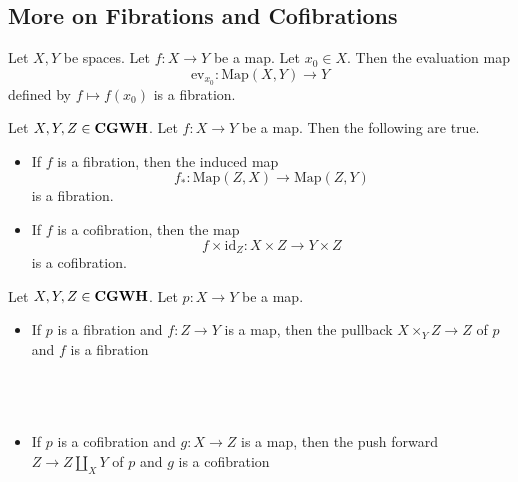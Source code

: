 \documentclass[a4paper]{article}
\begin{document}
\subsection{More on Fibrations and Cofibrations}
\begin{prp}{}{} Let $X,Y$ be spaces. Let $f:X\to Y$ be a map. Let $x_0\in X$. Then the evaluation map $$\text{ev}_{x_0}:\text{Map}(X,Y)\to Y$$ defined by $f\mapsto f(x_0)$ is a fibration. 
\end{prp}

\begin{prp}{}{} Let $X,Y,Z\in\bold{CGWH}$. Let $f:X\to Y$ be a map. Then the following are true. 
\begin{itemize}
\item If $f$ is a fibration, then the induced map $$f_\ast:\text{Map}(Z,X)\to\text{Map}(Z,Y)$$ is a fibration. 
\item If $f$ is a cofibration, then the map $$f\times\text{id}_Z:X\times Z\to Y\times Z$$ is a cofibration. 
\end{itemize}
\end{prp}

\begin{prp}{}{} Let $X,Y,Z\in\bold{CGWH}$. Let $p:X\to Y$ be a map. 
\begin{itemize}
\item If $p$ is a fibration and $f:Z\to Y$ is a map, then the pullback $X\times_YZ\to Z$ of $p$ and $f$ is a fibration \\~\\
\\~\\
\item If $p$ is a cofibration and $g:X\to Z$ is a map, then the push forward $Z\to Z\coprod_XY$ of $p$ and $g$ is a cofibration \\~\\
\\~\\
\end{itemize}
\end{prp}
\end{document}
